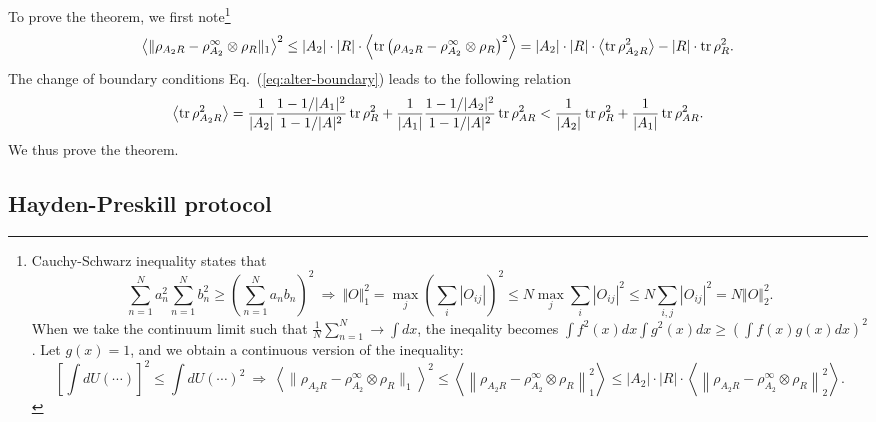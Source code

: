 \documentclass{SciPost}
\begin{document}
To prove the theorem, we first note\footnote{Cauchy-Schwarz inequality states that 
\begin{equation*}
	\sum_{n=1}^N a_n^2 \sum_{n=1}^N b_n^2 \ge \left(\sum_{n=1}^N a_n b_n\right)^{2} 
	\ \Longrightarrow \ 
	\Vert O \Vert_1^2 = \max_j \left(\sum_i|O_{ij}|\right)^2
	\le N\max_j \sum_i |O_{ij}|^2
	\le N\sum_{i,j} |O_{ij}|^2 = N\Vert O\Vert_2^2.
\end{equation*}
When we take the continuum limit such that $\frac{1}{N}\sum_{n=1}^N \rightarrow \int dx$, the ineqality becomes $\int f^2(x) dx \int g^2(x) dx \ge \left( \int f(x)g(x)dx \right)^2$. 
Let $g(x)=1$, and we obtain a continuous version of the inequality:
\begin{equation*}
	\left[\int dU ( \cdots ) \right]^2 \le \int dU (\cdots)^2 
	\ \Longrightarrow \ 
	\left\langle\|\rho_{A_2 R}-\rho^\infty_{A_2}\otimes \rho_R\|_1\right\rangle^2 \le \left\langle \left\|\rho_{A_2 R}-\rho^\infty_{A_2}\otimes \rho_R \right\|_1^2 \right\rangle
	\le |A_2|\cdot|R|\cdot \left\langle \left\|\rho_{A_2 R}-\rho^\infty_{A_2}\otimes \rho_R \right\|_2^2 \right\rangle.
\end{equation*}}
\begin{equation}
	\left\langle\|\rho_{A_2 R}-\rho^\infty_{A_2}\otimes \rho_R\|_1\right\rangle^2 
	\le |A_2|\cdot|R|\cdot \left\langle \operatorname{tr}\left(\rho_{A_2 R}-\rho^\infty_{A_2}\otimes \rho_R\right)^2 \right\rangle 
	= |A_2|\cdot|R|\cdot \left\langle \operatorname{tr}\rho_{A_2 R}^2 \right\rangle - |R|\cdot\operatorname{tr}\rho_R^2.
\end{equation}
The change of boundary conditions Eq.~(\ref{eq:alter-boundary}) leads to the following relation
\begin{equation}
	\left\langle\operatorname{tr} \rho_{A_2R}^2\right\rangle 
	= \frac{1}{|A_2|}\frac{1-1/|A_1|^2}{1-1/|A|^2}\operatorname{tr}\rho_R^2 + \frac{1}{|A_1|}\frac{1-1/|A_2|^2}{1-1/|A|^2}\operatorname{tr}\rho_{AR}^2
	< \frac{1}{|A_2|}\operatorname{tr}\rho_R^2 + \frac{1}{|A_1|}\operatorname{tr}\rho_{AR}^2.
\end{equation}
We thus prove the theorem.



\subsection{Hayden-Preskill protocol}

\label{Hayden-Preskill}
\end{document}
